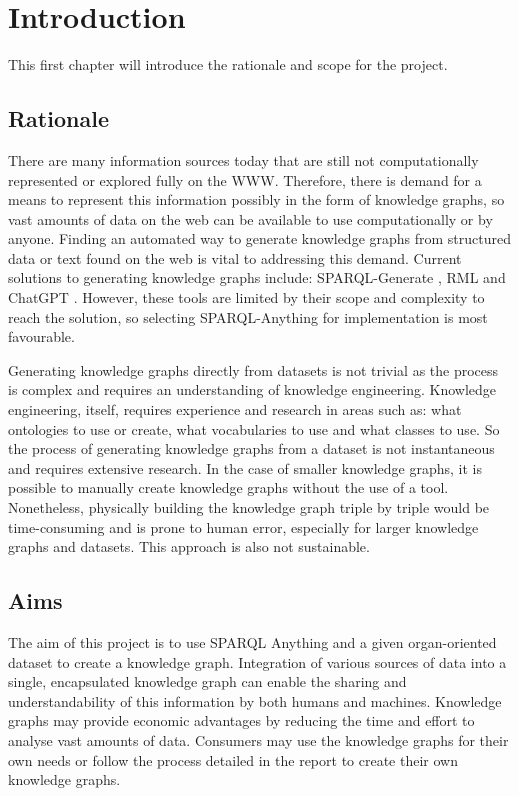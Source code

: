 \chapter{Introduction}
This first chapter will introduce the rationale and scope for the project.

\section{Rationale}
There are many information sources today that are still not computationally represented or explored fully on the WWW. Therefore, there is demand for a means to represent this information possibly in the form of knowledge graphs, so vast amounts of data on the web can be available to use computationally or by anyone. Finding an automated way to generate knowledge graphs from structured data or text found on the web is vital to addressing this demand. Current solutions to generating knowledge graphs include: SPARQL-Generate \cite{sparqlgenerate}, RML \cite{rml} and ChatGPT \cite{chatgptwebsite}. However, these tools are limited by their scope and complexity to reach the solution, so selecting SPARQL-Anything \cite{sparqlanythinggithub} for implementation is most favourable. 

Generating knowledge graphs directly from datasets is not trivial as the process is complex and requires an understanding of knowledge engineering. Knowledge engineering, itself, requires experience and research in areas such as: what ontologies to use or create, what vocabularies to use and what classes to use. So the process of generating knowledge graphs from a dataset is not instantaneous and requires extensive research. In the case of smaller knowledge graphs, it is possible to manually create knowledge graphs without the use of a tool. Nonetheless, physically building the knowledge graph triple by triple would be time-consuming and is prone to human error, especially for larger knowledge graphs and datasets. This approach is also not sustainable. 

\section{Aims}
The aim of this project is to use SPARQL Anything and a given organ-oriented dataset to create a knowledge graph. Integration of various sources of data into a single, encapsulated knowledge graph can enable the sharing and understandability of this information by both humans and machines. Knowledge graphs may provide economic advantages by reducing the time and effort to analyse vast amounts of data. Consumers may use the knowledge graphs for their own needs or follow the process detailed in the report to create their own knowledge graphs.

